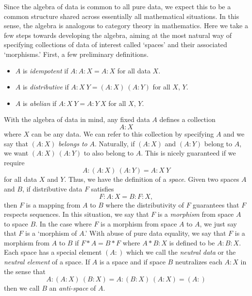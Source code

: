\documentclass[11pt]{article}
\begin{document}
     Since the algebra of data is common to all pure data, we expect this to be a common structure shared 
 across essentially all mathematical situations.  In this sense, the algebra is analogous to category theory 
 in mathematics.  Here we take a few steps towards developing the algebra, aiming at the most natural 
 way of specifying collections of data of interest called `spaces' and their associated `morphisms.'  First, a few 
 preliminary definitions.  
 \begin{itemize}
 \item $A$ is {\it idempotent} if $A:A:X=A:X$ for all data $X$.
 \item $A$ is {\it distributive} if $A:X\ Y=(A:X)\ (A:Y)$ for all $X$, $Y$.
 \item $A$ is {\it abelian} if $A:X\ Y=A:Y\ X$ for all $X$, $Y$.
 \end{itemize}
 With the algebra of data in mind, any fixed data $A$ defines a collection 
\begin{equation}\label{eqn}
A:X
\end{equation}
where $X$ can be any data.  We can refer to this collection by specifying $A$ and we say that $(A:X)$ {\it belongs to} $A$.  Naturally, 
if $(A:X)$ and $(A:Y)$ belong to $A$, we want $(A:X)\ (A:Y)$ to also belong to $A$.  This is nicely guaranteed if 
we require  
\begin{equation}\label{eqn}
A : (A : X)\ ( A: Y) = A : X\ Y 
\end{equation}
for all data $X$ and $Y$.  Thus, we have the definition of a {\it space}.  Given two spaces $A$ and $B$, if 
distributive data $F$ satisfies 
\begin{equation}\label{eqn}
F : A : X = B : F : X,
\end{equation}
then $F$ is a mapping from $A$ to $B$ where the distributivity of $F$ guarantees that $F$ respects sequences.  
In this situation, we say that $F$ is a {\it morphism} from space $A$ to space $B$.  In the case where $F$ 
is a morphism from space $A$ to $A$, we just say that $F$ is a `morphism of $A$.'  With abuse of pure data 
equality, we say that $F$ is a morphism from $A$ to $B$ if $F*A=B*F$ where $A*B:X$ is defined to be $A:B:X$.  
Each space has a special element $(A:)$ which we call the {\it neutral data} or the {\it neutral element} of a space.  
If $A$ is a space and if space $B$ neutralizes each $A:X$ in the sense that 
\begin{equation}\label{eqn}
A : (A:X)\ (B:X) = A : (B:X)\ (A:X) =  (A:)
\end{equation}
then we call $B$ an {\it anti-space} of $A$. 
\end{document}
